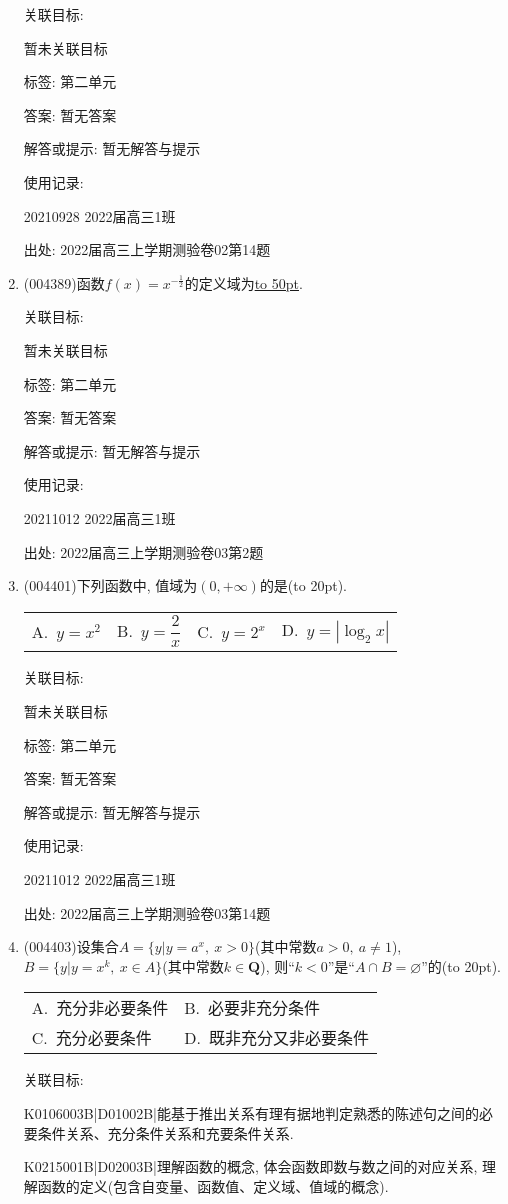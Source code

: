 \documentclass[10pt,a4paper]{article}
\newcommand{\blank}[1]{\underline{\hbox to #1pt{}}}
\newcommand{\bracket}[1]{(\hbox to #1pt{})}
\newcommand{\twoch}[4]{\par\begin{tabular}{p{.46\textwidth}p{.46\textwidth}}
A.~#1& B.~#2\\
C.~#3& D.~#4
\end{tabular}}
\newcommand{\fourch}[4]{\par\begin{tabular}{p{.23\textwidth}p{.23\textwidth}p{.23\textwidth}p{.23\textwidth}}
A.~#1 &B.~#2& C.~#3& D.~#4
\end{tabular}}
\begin{document}
\begin{enumerate}[1.]
关联目标:

暂未关联目标



标签: 第二单元

答案: 暂无答案

解答或提示: 暂无解答与提示

使用记录:

20210928	2022届高三1班		


出处: 2022届高三上学期测验卷02第14题
\item { (004389)}函数$f(x)=x^{- \frac 12}$的定义域为\blank{50}.


关联目标:

暂未关联目标



标签: 第二单元

答案: 暂无答案

解答或提示: 暂无解答与提示

使用记录:

20211012	2022届高三1班	


出处: 2022届高三上学期测验卷03第2题
\item { (004401)}下列函数中, 值域为$(0,+\infty)$的是\bracket{20}.
\fourch{$y=x^2$}{$y=\dfrac 2x$}{$y=2^x$}{$y=|\log_2x|$}


关联目标:

暂未关联目标



标签: 第二单元

答案: 暂无答案

解答或提示: 暂无解答与提示

使用记录:

20211012	2022届高三1班	


出处: 2022届高三上学期测验卷03第14题
\item { (004403)}设集合$A=\{y|y=a^x,\ x>0\}$(其中常数$a>0,  \ a\ne 1$), $B=\{y|y=x^k,\ x\in A\}$(其中常数$k\in \mathbf{Q}$), 则``$k<0$''是``$A\cap B=\varnothing$''的\bracket{20}.
\twoch{充分非必要条件}{必要非充分条件}{充分必要条件}{既非充分又非必要条件}


关联目标:

K0106003B|D01002B|能基于推出关系有理有据地判定熟悉的陈述句之间的必要条件关系、充分条件关系和充要条件关系.

K0215001B|D02003B|理解函数的概念, 体会函数即数与数之间的对应关系, 理解函数的定义(包含自变量、函数值、定义域、值域的概念).




\end{enumerate}
\end{document}
